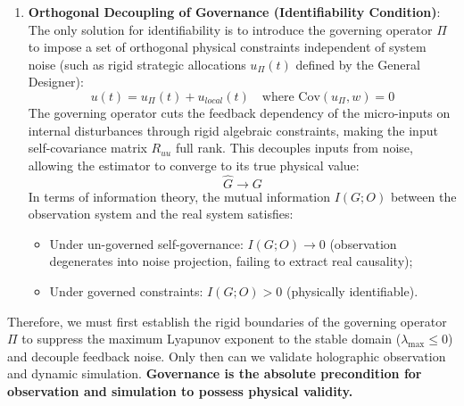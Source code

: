 \documentclass{article}
\begin{document}
\begin{enumerate}
    \item \textbf{Orthogonal Decoupling of Governance (Identifiability Condition)}:
    The only solution for identifiability is to introduce the governing operator $\Pi$ to impose a set of orthogonal physical constraints independent of system noise (such as rigid strategic allocations $u_{\Pi}(t)$ defined by the General Designer):
    \begin{equation}
        u(t) = u_{\Pi}(t) + u_{local}(t) \quad \text{where } \text{Cov}(u_{\Pi}, w) = 0
    \end{equation}
    The governing operator cuts the feedback dependency of the micro-inputs on internal disturbances through rigid algebraic constraints, making the input self-covariance matrix $R_{uu}$ full rank. This decouples inputs from noise, allowing the estimator to converge to its true physical value:
    \begin{equation}
        \hat{G} \longrightarrow G
    \end{equation}
    In terms of information theory, the mutual information $I(G; O)$ between the observation system and the real system satisfies:
    \begin{itemize}
        \item Under un-governed self-governance: $I(G; O) \to 0$ (observation degenerates into noise projection, failing to extract real causality);
        \item Under governed constraints: $I(G; O) > 0$ (physically identifiable).
    \end{itemize}
\end{enumerate}
Therefore, we must first establish the rigid boundaries of the governing operator $\Pi$ to suppress the maximum Lyapunov exponent to the stable domain ($\lambda_{\text{max}} \le 0$) and decouple feedback noise. Only then can we validate holographic observation and dynamic simulation. \textbf{Governance is the absolute precondition for observation and simulation to possess physical validity.}
\end{document}
